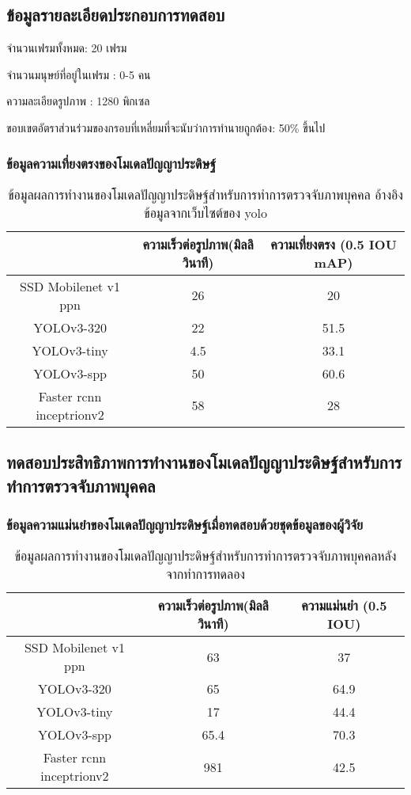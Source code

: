 \subsection{ข้อมูลรายละเอียดประกอบการทดสอบ}
จำนวนเฟรมทั้งหมด: 20 เฟรม

จำนวนมนุษย์ที่อยู่ในเฟรม : 0-5 คน

ความละเอียดรูปภาพ : 1280   พิกเซล

ขอบเขตอัตราส่วนร่วมของกรอบที่เหลี่ยมที่จะนับว่าการทำนายถูกต้อง: 50\% ขึ้นไป

\subsubsection*{ข้อมูลความเที่ยงตรงของโมเดลปัญญาประดิษฐ์}
\begin{table}[!ht]
    \centering
	\begin{tabular}{|c|c|c|}
			\hline
			{}&{ความเร็วต่อรูปภาพ(มิลลิวินาที)}&{ความเที่ยงตรง (0.5 IOU mAP)}			\\
			\hline
			SSD Mobilenet v1 ppn	 		& 26				& 20														\\
			YOLOv3-320				& 22				& 51.5				\\	
			YOLOv3-tiny				& 4.5				& 33.1				\\
			YOLOv3-spp				& 50				& 60.6				\\	
			Faster rcnn inceptrionv2		& 58				& 28		\\
		\hline
	\end{tabular}
	\caption{ข้อมูลผลการทำงานของโมเดลปัญญาประดิษฐ์สำหรับการทำการตรวจจับภาพบุคคล อ้างอิงข้อมูลจากเว็บไซต์ของ yolo}
    	\label{tab:origina_detectEx}
\end{table}


\subsection{ทดสอบประสิทธิภาพการทำงานของโมเดลปัญญาประดิษฐ์สำหรับการทำการตรวจจับภาพบุคคล}
\subsubsection*{ข้อมูลความแม่นยำของโมเดลปัญญาประดิษฐ์เมื่อทดสอบด้วยชุดข้อมูลของผู้วิจัย}
\begin{table}[!ht]
	\centering
	\begin{tabular}{|c|c|c|}
			\hline 
			{}&{ความเร็วต่อรูปภาพ(มิลลิวินาที)}&{ความแม่นยำ (0.5 IOU)}			\\
			\hline
			SSD Mobilenet v1 ppn	 					& 63 			& 37			\\
			YOLOv3-320							& 65			& 64.9		\\
			YOLOv3-tiny							& 17			& 44.4			\\
			YOLOv3-spp							& 65.4			& 70.3			\\	
			Faster rcnn inceptrionv2					& 981		& 42.5		\\
		\hline
	\end{tabular}
	\caption{ข้อมูลผลการทำงานของโมเดลปัญญาประดิษฐ์สำหรับการทำการตรวจจับภาพบุคคลหลังจากทำการทดลอง}
    	\label{tab:origina_detectEx}
\end{table}
